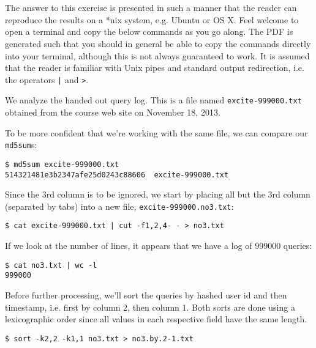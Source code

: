 
\section{}

\label{appendix:1}

The answer to this exercise is presented in such a manner that the reader can
reproduce the results on a *nix system, e.g. Ubuntu or OS X. Feel welcome to
open a terminal and copy the below commands as you go along. The PDF is
generated such that you should in general be able to copy the commands directly
into your terminal, although this is not always guaranteed to work. It is
assumed that the reader is familiar with Unix pipes and standard output
redirection, i.e. the operators \texttt{|} and \texttt{>}.

We analyze the handed out query log. This is a file named
\texttt{excite-999000.txt} obtained from the course web site on November 18,
2013.

To be more confident that we're working with the same file, we can compare our
\texttt{md5sum}s:

\begin{lstlisting}
$ md5sum excite-999000.txt
514321481e3b2347afe25d0243c88606  excite-999000.txt
\end{lstlisting}

Since the 3rd column is to be ignored, we start by placing all but the 3rd
column (separated by tabs) into a new file, \texttt{excite-999000.no3.txt}:

\begin{lstlisting}
$ cat excite-999000.txt | cut -f1,2,4- - > no3.txt
\end{lstlisting}

If we look at the number of lines, it appears that we have a log of 999000
queries:

\begin{lstlisting}
$ cat no3.txt | wc -l
999000
\end{lstlisting}

Before further processing, we'll sort the queries by hashed user id and then
timestamp, i.e. first by column 2, then column 1. Both sorts are done using a
lexicographic order since all values in each respective field have the same
length.

\begin{lstlisting}
$ sort -k2,2 -k1,1 no3.txt > no3.by.2-1.txt
\end{lstlisting}

